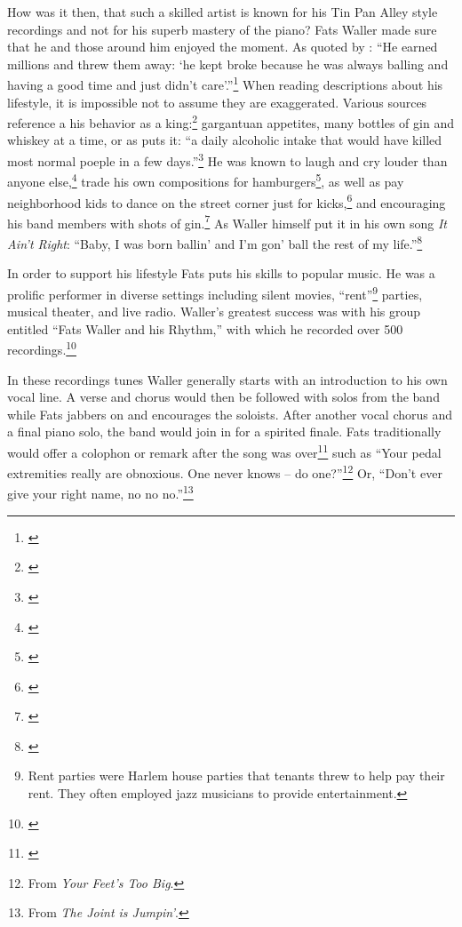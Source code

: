 \documentclass[11pt]{report}
\begin{document}
	\label{sec:thesis}
	How was it then, that such a skilled artist is known for his Tin Pan Alley style recordings and not for his superb mastery of the piano? Fats Waller made sure that he and those around him enjoyed the moment. As quoted by \citeauthor{jazz_scene}: ``He earned millions and threw them away: `he kept broke because he was always balling and having a good time and just didn't care'.''\footnote{\cite[208]{jazz_scene}} When reading descriptions about his lifestyle, it is impossible not to assume they are exaggerated. Various sources reference a his behavior as a king:\footnote{\cite[207]{jazz_scene}} gargantuan appetites, many bottles of gin and whiskey at a time, or as \citeauthor{life} puts it: ``a daily alcoholic intake that would have killed most normal poeple in a few days.''\footnote{\cite[2]{life}} He was known to laugh and cry louder than anyone else,\footnote{\cite[208]{jazz_scene}} trade his own compositions for hamburgers\footnote{\cite[144]{visions}}, as well as pay neighborhood kids to dance on the street corner just for kicks,\footnote{\cite[2]{life}} and encouraging his band members with shots of gin.\footnote{\cite[227]{anecdotes}} As Waller himself put it in his own song \emph{It Ain't Right}: ``Baby, I was born ballin' and I'm gon' ball the rest of my life.''\footnote{\cite[5]{outside-insider}}
	
	In order to support his lifestyle Fats puts his skills to popular music. He was a prolific performer in diverse settings including silent movies, ``rent''\footnote{Rent parties were Harlem house parties that tenants threw to help pay their rent. They often employed jazz musicians to provide entertainment.} parties, musical theater, and live radio. Waller's greatest success was with his group entitled ``Fats Waller and his Rhythm,'' with which he recorded over 500 recordings.\footnote{\cite[145]{visions}}
	
	In these recordings tunes Waller generally starts with an introduction to his own vocal line. A verse and chorus would then be followed with solos from the band while Fats jabbers on and encourages the soloists. After another vocal chorus and a final piano solo, the band would join in for a spirited finale. Fats traditionally would offer a colophon or remark after the song was over\footnote{\cite[6]{outside-insider}} such as ``Your pedal extremities really are obnoxious. One never knows -- do one?''\footnote{From \emph{Your Feet's Too Big}.} Or, ``Don't ever give your right name, no no no.''\footnote{From \emph{The Joint is Jumpin'}.}
	
\end{document}
